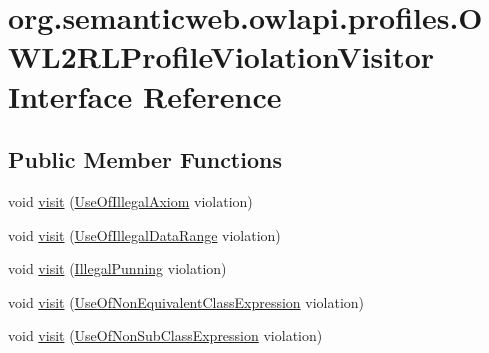 \hypertarget{interfaceorg_1_1semanticweb_1_1owlapi_1_1profiles_1_1_o_w_l2_r_l_profile_violation_visitor}{\section{org.\-semanticweb.\-owlapi.\-profiles.\-O\-W\-L2\-R\-L\-Profile\-Violation\-Visitor Interface Reference}
\label{interfaceorg_1_1semanticweb_1_1owlapi_1_1profiles_1_1_o_w_l2_r_l_profile_violation_visitor}
}
\subsection*{Public Member Functions}
\begin{DoxyCompactItemize}
\item 
void \hyperlink{interfaceorg_1_1semanticweb_1_1owlapi_1_1profiles_1_1_o_w_l2_r_l_profile_violation_visitor_a03838c1d7418de6326e3dced52dedae6}{visit} (\hyperlink{classorg_1_1semanticweb_1_1owlapi_1_1profiles_1_1_use_of_illegal_axiom}{Use\-Of\-Illegal\-Axiom} violation)
\item 
void \hyperlink{interfaceorg_1_1semanticweb_1_1owlapi_1_1profiles_1_1_o_w_l2_r_l_profile_violation_visitor_a2b6a90ba49eb72efba24c5a67ed9f808}{visit} (\hyperlink{classorg_1_1semanticweb_1_1owlapi_1_1profiles_1_1_use_of_illegal_data_range}{Use\-Of\-Illegal\-Data\-Range} violation)
\item 
void \hyperlink{interfaceorg_1_1semanticweb_1_1owlapi_1_1profiles_1_1_o_w_l2_r_l_profile_violation_visitor_ac53139b5826be57dd7739018952ef3f5}{visit} (\hyperlink{classorg_1_1semanticweb_1_1owlapi_1_1profiles_1_1_illegal_punning}{Illegal\-Punning} violation)
\item 
void \hyperlink{interfaceorg_1_1semanticweb_1_1owlapi_1_1profiles_1_1_o_w_l2_r_l_profile_violation_visitor_a392e10401cf8265d472358ac82358c30}{visit} (\hyperlink{classorg_1_1semanticweb_1_1owlapi_1_1profiles_1_1_use_of_non_equivalent_class_expression}{Use\-Of\-Non\-Equivalent\-Class\-Expression} violation)
\item 
void \hyperlink{interfaceorg_1_1semanticweb_1_1owlapi_1_1profiles_1_1_o_w_l2_r_l_profile_violation_visitor_a05b7bf23139766e0b0b14b35bdc1f1da}{visit} (\hyperlink{classorg_1_1semanticweb_1_1owlapi_1_1profiles_1_1_use_of_non_sub_class_expression}{Use\-Of\-Non\-Sub\-Class\-Expression} violation)
\item 

\end{DoxyCompactItemize}
